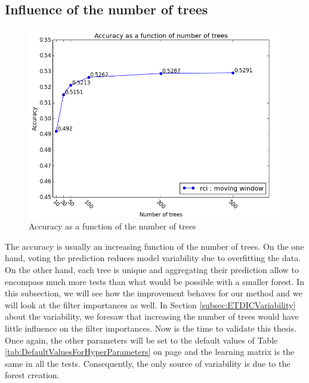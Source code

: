 \documentclass[a4paper]{report}
\begin{document}
		\subsection{Influence of the number of trees}
		\begin{figure}
			\centering
				\includegraphics[width=1.0\textwidth]{images/accFnbTrees.png}
			\caption{\label{fig:accFnbTrees}Accuracy as a function of the number of trees}
		\end{figure}
		The accuracy is usually an increasing function of the number of trees. On the one hand, voting the prediction reduces model variability due to overfitting the data. On the other hand, each tree is unique and aggregating their prediction allow to encompass much more tests than what would be possible with a smaller forest. In this subsection, we will see how the improvement behaves for our method and we will look at the filter importances as well. In Section \ref{subsec:ETDICVariability} about the variability, we foresaw that increasing the number of trees would have little influence on the filter importances. Now is the time to validate this thesis. Once again, the other parameters will be set to the default values of Table \ref{tab:DefaultValuesForHyperParameters} on page \pageref{tab:DefaultValuesForHyperParameters} and the learning matrix is the same in all the tests. Consequently, the only source of variability is due to the forest creation.
\end{document}

